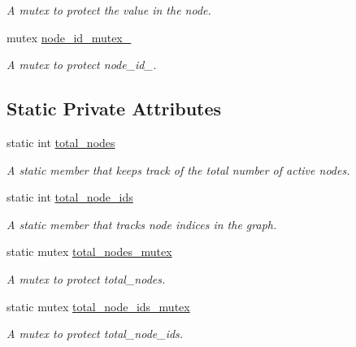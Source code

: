 \begin{DoxyCompactItemize}
\begin{DoxyCompactList}\small\item\em A mutex to protect the value in the node. \end{DoxyCompactList}\item 
\hypertarget{classNode_aa2e8d02482477aa2f05db0e6bb409339}{mutex \hyperlink{classNode_aa2e8d02482477aa2f05db0e6bb409339}{node\-\_\-id\-\_\-mutex\-\_\-}}\label{classNode_aa2e8d02482477aa2f05db0e6bb409339}

\begin{DoxyCompactList}\small\item\em A mutex to protect node\-\_\-id\-\_\-. \end{DoxyCompactList}\end{DoxyCompactItemize}
\subsection*{Static Private Attributes}
\begin{DoxyCompactItemize}
\item 
\hypertarget{classNode_a7f128d924b8d003fd03b258a99e71a67}{static int \hyperlink{classNode_a7f128d924b8d003fd03b258a99e71a67}{total\-\_\-nodes}}\label{classNode_a7f128d924b8d003fd03b258a99e71a67}

\begin{DoxyCompactList}\small\item\em A static member that keeps track of the total number of active nodes. \end{DoxyCompactList}\item 
\hypertarget{classNode_a280f4f7c00e3b9755bd0b47c3d0a91b7}{static int \hyperlink{classNode_a280f4f7c00e3b9755bd0b47c3d0a91b7}{total\-\_\-node\-\_\-ids}}\label{classNode_a280f4f7c00e3b9755bd0b47c3d0a91b7}

\begin{DoxyCompactList}\small\item\em A static member that tracks node indices in the graph. \end{DoxyCompactList}\item 
\hypertarget{classNode_a4ee6b9388653c1d3b1d94c7b91b40253}{static mutex \hyperlink{classNode_a4ee6b9388653c1d3b1d94c7b91b40253}{total\-\_\-nodes\-\_\-mutex}}\label{classNode_a4ee6b9388653c1d3b1d94c7b91b40253}

\begin{DoxyCompactList}\small\item\em A mutex to protect total\-\_\-nodes. \end{DoxyCompactList}\item 
\hypertarget{classNode_ac18d36beb867879f0a319557e783e146}{static mutex \hyperlink{classNode_ac18d36beb867879f0a319557e783e146}{total\-\_\-node\-\_\-ids\-\_\-mutex}}\label{classNode_ac18d36beb867879f0a319557e783e146}

\begin{DoxyCompactList}\small\item\em A mutex to protect total\-\_\-node\-\_\-ids. \end{DoxyCompactList}\end{DoxyCompactItemize}
